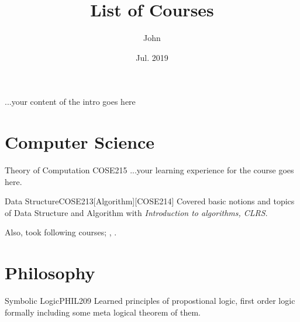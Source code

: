 \documentclass{listcourse}
\author{John} %
\date{Jul. 2019} %
\title{List of Courses} %
\begin{document}
\maketitle %

\begin{intro}
	...your content of the intro goes here
\end{intro}


\section*{Computer Science}


\begin{addCourse}{Theory of Computation	}{COSE215}
	...your learning experience for the course goes here.
\end{addCourse}


\begin{addCourse}{Data Structure}{COSE213}[Algorithm][COSE214]
Covered basic notions and topics of Data Structure and Algorithm with \textit{Introduction to algorithms, CLRS}.
\end{addCourse}



\noindent Also, took following courses; , .



\section*{Philosophy}

\begin{addCourse}{Symbolic Logic}{PHIL209}
Learned principles of propostional logic, first order logic formally including some meta logical theorem of them. 
\end{addCourse}
\end{document}
